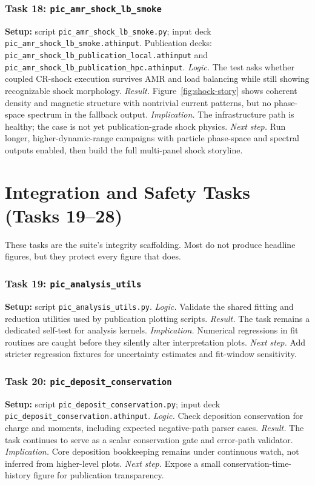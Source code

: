 \documentclass[twocolumn]{aastex701}
\newcommand{\logic}[1]{\textit{Logic.} #1}
\newcommand{\result}[1]{\textit{Result.} #1}
\newcommand{\implication}[1]{\textit{Implication.} #1}
\newcommand{\nextstep}[1]{\textit{Next step.} #1}
\begin{document}
\subsubsection*{Task 18: \texttt{pic\_amr\_shock\_lb\_smoke}}
\textbf{Setup:} script \texttt{pic\_amr\_shock\_lb\_smoke.py}; input deck
\texttt{pic\_amr\_shock\_lb\_smoke.athinput}. Publication decks:
\texttt{pic\_amr\_shock\_lb\_publication\_local.athinput} and
\texttt{pic\_amr\_shock\_lb\_publication\_hpc.athinput}. \logic{The test asks
whether coupled CR-shock execution survives AMR and load balancing while still
showing recognizable shock morphology.} \result{Figure~\ref{fig:shock-story}
shows coherent density and magnetic structure with nontrivial current patterns,
but no phase-space spectrum in the fallback output.} \implication{The
infrastructure path is healthy; the case is not yet publication-grade shock
physics.} \nextstep{Run longer, higher-dynamic-range campaigns with particle
phase-space and spectral outputs enabled, then build the full multi-panel shock
storyline.}

\section{Integration and Safety Tasks (Tasks 19--28)}

These tasks are the suite's integrity scaffolding. Most do not produce headline
figures, but they protect every figure that does.

\subsubsection*{Task 19: \texttt{pic\_analysis\_utils}}
\textbf{Setup:} script \texttt{pic\_analysis\_utils.py}. \logic{Validate the
shared fitting and reduction utilities used by publication plotting scripts.}
\result{The task remains a dedicated self-test for analysis kernels.}
\implication{Numerical regressions in fit routines are caught before they
silently alter interpretation plots.} \nextstep{Add stricter regression
fixtures for uncertainty estimates and fit-window sensitivity.}

\subsubsection*{Task 20: \texttt{pic\_deposit\_conservation}}
\textbf{Setup:} script \texttt{pic\_deposit\_conservation.py}; input deck
\texttt{pic\_deposit\_conservation.athinput}. \logic{Check deposition
conservation for charge and moments, including expected negative-path parser
cases.} \result{The task continues to serve as a scalar conservation gate and
error-path validator.} \implication{Core deposition bookkeeping remains under
continuous watch, not inferred from higher-level plots.} \nextstep{Expose a
small conservation-time-history figure for publication transparency.}
\end{document}
